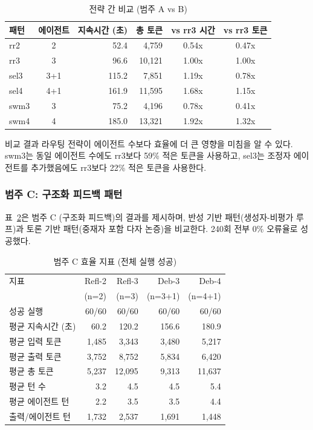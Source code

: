 \begin{table}[H]
\centering
\caption{전략 간 비교 (범주 A vs B)}
\label{tab:cross-ab}
{\small
\begin{tabular}{lcrrcc}
\toprule
패턴 & 에이전트 & 지속시간 (초) & 총 토큰 & vs rr3 시간 & vs rr3 토큰 \\
\midrule
rr2  & 2   & 52.4  & 4,759  & 0.54x & 0.47x \\
rr3  & 3   & 96.6  & 10,121 & 1.00x & 1.00x \\
sel3 & 3+1 & 115.2 & 7,851  & 1.19x & 0.78x \\
sel4 & 4+1 & 161.9 & 11,595 & 1.68x & 1.15x \\
swm3 & 3   & 75.2  & 4,196  & 0.78x & 0.41x \\
swm4 & 4   & 185.0 & 13,321 & 1.92x & 1.32x \\
\bottomrule
\end{tabular}
}
\end{table}

비교 결과 라우팅 전략이 에이전트 수보다 효율에 더 큰 영향을 미침을 알 수 있다. swm3는 동일 에이전트 수에도 rr3보다 59\% 적은 토큰을 사용하고, sel3는 조정자 에이전트를 추가했음에도 rr3보다 22\% 적은 토큰을 사용한다.

\subsubsection{범주 C: 구조화 피드백 패턴}

표~\ref{tab:cat-c}은 범주 C (구조화 피드백)의 결과를 제시하며, 반성 기반 패턴(생성자-비평가 루프)과 토론 기반 패턴(중재자 포함 다자 논증)을 비교한다. 240회 전부 0\% 오류율로 성공했다.

\begin{table}[H]
\centering
\caption{범주 C 효율 지표 (전체 실행 성공)}
\label{tab:cat-c}
{\small
\begin{tabular}{lrrrr}
\toprule
지표 & Refl-2 & Refl-3 & Deb-3 & Deb-4 \\
    & (n=2)  & (n=3)  & (n=3+1) & (n=4+1) \\
\midrule
성공 실행       & 60/60 & 60/60 & 60/60 & 60/60 \\
평균 지속시간 (초) & 60.2 & 120.2 & 156.6 & 180.9 \\
평균 입력 토큰   & 1,485 & 3,343 & 3,480 & 5,217 \\
평균 출력 토큰   & 3,752 & 8,752 & 5,834 & 6,420 \\
평균 총 토큰     & 5,237 & 12,095 & 9,313 & 11,637 \\
평균 턴 수       & 3.2 & 4.5 & 4.5 & 5.4 \\
평균 에이전트 턴 & 2.2 & 3.5 & 3.5 & 4.4 \\
출력/에이전트 턴 & 1,732 & 2,537 & 1,691 & 1,448 \\
\bottomrule
\end{tabular}
}
\end{table}

